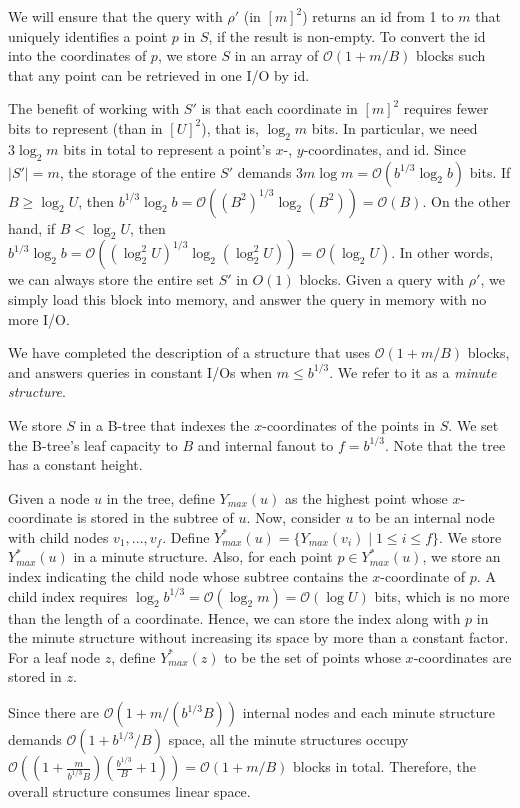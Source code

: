\documentclass{sig-alternate}
\def\extraspacing{\vspace{2mm} \noindent}
\newcommand{\bigO}{\mathcal{O}}
\renewcommand{\(}{\left(}
\renewcommand{\)}{\right)}
\begin{document}
We will ensure that the query with $\rho'$ (in $[m]^2$) returns an id from 1 to
$m$ that uniquely identifies a point $p$ in $S$, if the result is non-empty. To
convert the id into the coordinates of $p$, we store $S$ in an array of
$\bigO(1 + m/B)$ blocks such that any point can be retrieved in one I/O by id.

The benefit of working with $S'$ is that
each coordinate in $[m]^2$ requires fewer bits to represent (than in $[U]^2$),
that is, $\log_2 m$ bits. In particular, we need $3 \log_2 m$ bits in total to
represent a point's $x$-, $y$-coordinates, and id. Since $|S'| = m$, the
storage of the entire $S'$ demands $3m \log m = \bigO(b^{1/3} \log_2 b)$ bits. If $B \geq \log_2 U$, then $b^{1/3} \log_2 b = \bigO((B^2)^{1/3} \log_2 (B^2)) = \bigO(B)$. On the other hand, if $B < \log_2 U$, then $b^{1/3} \log_2 b = \bigO((\log_2^2 U)^{1/3} \log_2 (\log_2^2 U))
= \bigO(\log_2 U)$. In other words, we can always store the entire set $S'$ in 
$O(1)$ blocks. Given a query with $\rho'$, we simply load this block into
memory, and answer the query in memory with no more I/O.

We have completed the description of a structure that uses $\bigO(1 + m/B)$ blocks, and answers queries in constant I/Os when $m \le b^{1/3}$. We refer to it as a {\em minute structure}.

\extraspacing {\bf Proof of Lemma~\ref{lmm:div-ray}.} We store $S$ in a B-tree that indexes the $x$-coordinates of the points in $S$. We set the B-tree's leaf capacity to $B$ and internal fanout to $f = b^{1/3}$. Note that the tree has a constant height.

Given a node $u$ in the tree, define $Y_{max}(u)$ as the highest point whose $x$-coordinate is stored in the subtree of $u$. Now, consider $u$ to be an internal node with child nodes $v_1, ..., v_{f}$. Define $Y^*_{max}(u) = \{Y_{max}(v_i) \mid 1 \le i \le f\}$. We store $Y^*_{max}(u)$ in a minute structure. Also, for each point $p \in Y^*_{max}(u)$, we store an index indicating the child node whose subtree contains the $x$-coordinate of $p$. A child index requires $\log_2 b^{1/3} = \bigO(\log_2 m) = \bigO(\log U)$ bits, which is no more than the length of a coordinate. Hence, we can store the index along with $p$ in the minute structure without increasing its space by more than a constant factor. For a leaf node $z$, define $Y^*_{max}(z)$ to be the set of points whose $x$-coordinates are stored in $z$.

Since there are $\bigO(1 + m/(b^{1/3}B))$ internal nodes and each
minute structure demands $\bigO (1 + b^{1/3}/B)$ space, all the minute structures
occupy $\bigO( (1 + \frac{m}{b^{1/3}B})(\frac{b^{1/3}}{B}+1) )= \bigO(1 + m/B)$ blocks in total. Therefore, the overall structure consumes linear space.
\end{document}
